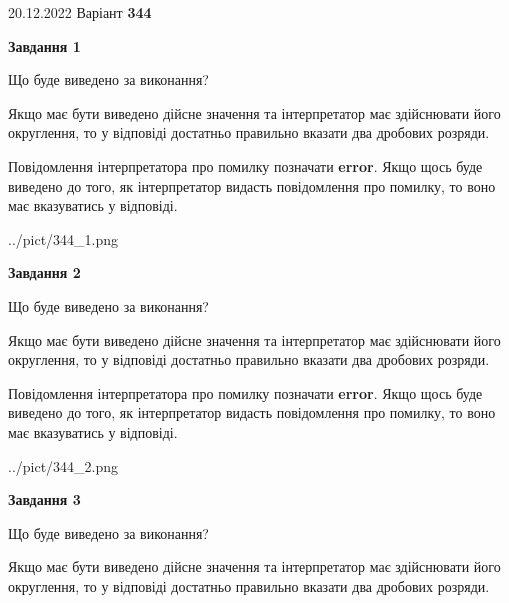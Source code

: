 \documentclass[12pt, ukrainian]{article}
\begin{document}
{20.12.2022 Варіант \No \textbf { 344 }\par}
{
\begin {Large}

{\begin {center}\textbf{Завдання 1}\end {center}}\par
Що буде виведено за виконання? \par

Якщо має бути виведено дійсне значення та інтерпретатор має здійснювати його округлення, 
то у відповіді достатньо правильно вказати два дробових розряди.

Повідомлення інтерпретатора про помилку позначати \textbf{error}.
Якщо щось буде виведено до того, як інтерпретатор видасть повідомлення про помилку, 
то воно має вказуватись у відповіді. \par

\begin{center}
	{../pict/344_1.png}
\end{center}
\newpage

{\begin {center}\textbf{Завдання 2}\end {center}}\par
Що буде виведено за виконання? \par

Якщо має бути виведено дійсне значення та інтерпретатор має здійснювати його округлення, 
то у відповіді достатньо правильно вказати два дробових розряди.

Повідомлення інтерпретатора про помилку позначати \textbf{error}.
Якщо щось буде виведено до того, як інтерпретатор видасть повідомлення про помилку, 
то воно має вказуватись у відповіді. \par

\begin{center}
	{../pict/344_2.png}
\end{center}
\newpage

{\begin {center}\textbf{Завдання 3}\end {center}}\par
Що буде виведено за виконання? \par

Якщо має бути виведено дійсне значення та інтерпретатор має здійснювати його округлення, 
то у відповіді достатньо правильно вказати два дробових розряди.


\end{Large}}
\end{document}
